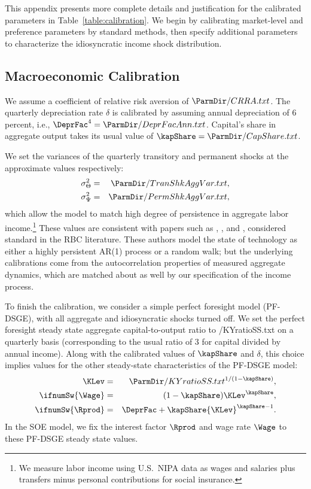 This appendix presents more complete details and justification for the calibrated parameters in Table~\ref{table:calibration}.  We begin by calibrating market-level and preference parameters by standard methods, then specify additional parameters to characterize the idiosyncratic income shock distribution.

\subsection{Macroeconomic Calibration}
\label{sec:MacroCal}

We assume a coefficient of relative risk aversion of
$
 \ParmDir/CRRA.txt
$. %
The quarterly depreciation rate $\delta$ is calibrated by assuming annual depreciation of 6 percent,
i.e.,
$
\DeprFac^{4}=  \ParmDir/DeprFacAnn.txt
$.  Capital's share in aggregate output takes its usual value of
$
\kapShare=  \ParmDir/CapShare.txt
$.

We set the variances of the quarterly transitory and permanent shocks at the approximate values respectively:
\begin{eqnarray*}
	\sigma^{2}_{\Theta} & = &  \ParmDir/TranShkAggVar.txt ,
	\\ \sigma^{2}_{\Psi}  & =  &  \ParmDir/PermShkAggVar.txt ,
\end{eqnarray*}
which allow the model to match high degree of persistence in aggregate labor income.\footnote{We measure labor income using U.S.\ NIPA data as wages and salaries plus transfers minus personal contributions for social insurance.} These values are consistent with papers such as \cite{jermannProduction}, \cite{bcfHabits}, and \cite{ckmCritique}, considered standard  in the RBC literature. These authors model the state of technology as either a highly persistent AR(1) process or a random walk; but the underlying calibrations come from the autocorrelation properties of measured aggregate dynamics, which are matched about as well by our specification of the income process.

To finish the calibration, we consider a simple perfect foresight model (PF-DSGE), with all aggregate and idiosyncratic shocks turned off.  We set the perfect foresight steady state aggregate capital-to-output ratio to  \ParmDir/KYratioSS.txt on a quarterly basis (corresponding to the usual ratio of 3 for capital divided by annual income).  Along with the calibrated values of $\kapShare$ and $\delta$, this choice implies values for the other steady-state characteristics of the PF-DSGE model:
\begin{eqnarray*} %
	{\KLev} & = &  \ParmDir/KYratioSS.txt ^{1/(1-\kapShare)},
	\\ \ifnumSw {\Wage} & = & (1-\kapShare) {\KLev}^{\kapShare},
	\\ \ifnumSw {\Rprod} & = & \DeprFac+\kapShare {\KLev}^{\kapShare-1}
	.
\end{eqnarray*}
In the SOE model, we fix the interest factor $\Rprod$ and wage rate $\Wage$ to these PF-DSGE steady state values.

